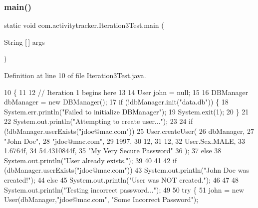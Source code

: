 \subsubsection{\texorpdfstring{main()}{main()}}
{\footnotesize\ttfamily static void com.\+activitytracker.\+Iteration3\+Test.\+main (\begin{DoxyParamCaption}\item[{String \mbox{[}$\,$\mbox{]}}]{args }\end{DoxyParamCaption})\hspace{0.3cm}{\ttfamily [static]}}



Definition at line 10 of file Iteration3\+Test.\+java.


\begin{DoxyCode}
10                                            \{
11 
12         \textcolor{comment}{// Iteration 1 begins here}
13 
14         User john = null;
15 
16         DBManager dbManager = \textcolor{keyword}{new} DBManager();
17         \textcolor{keywordflow}{if} (!dbManager.init(\textcolor{stringliteral}{"data.db"})) \{
18             System.err.println(\textcolor{stringliteral}{"Failed to initialize DBManager"});
19             System.exit(1);
20         \}
21 
22         System.out.println(\textcolor{stringliteral}{"Attempting to create user..."});
23 
24         \textcolor{keywordflow}{if} (!dbManager.userExists(\textcolor{stringliteral}{"jdoe@mac.com"}))
25             User.createUser(
26                     dbManager,
27                     \textcolor{stringliteral}{"John Doe"},
28                     \textcolor{stringliteral}{"jdoe@mac.com"},
29                     1997,
30                     12,
31                     12,
32                     User.Sex.MALE,
33                     1.6764f,
34                     54.4310844f,
35                     \textcolor{stringliteral}{"My Very Secure Password"}
36             );
37         \textcolor{keywordflow}{else}
38             System.out.println(\textcolor{stringliteral}{"User already exists."});
39 
40 
41 
42         \textcolor{keywordflow}{if} (dbManager.userExists(\textcolor{stringliteral}{"jdoe@mac.com"}))
43             System.out.println(\textcolor{stringliteral}{"John Doe was created!"});
44         \textcolor{keywordflow}{else}
45             System.out.println(\textcolor{stringliteral}{"User was NOT created."});
46 
47 
48         System.out.println(\textcolor{stringliteral}{"Testing incorrect password..."});
49 
50         \textcolor{keywordflow}{try} \{
51             john = \textcolor{keyword}{new} User(dbManager,\textcolor{stringliteral}{"jdoe@mac.com"}, \textcolor{stringliteral}{"Some Incorrect Password"});

\end{DoxyCode}
